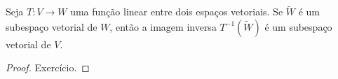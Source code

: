 \begin{theorem}
	Seja $T\colon V\to W$ uma função linear entre dois espaços vetoriais. Se $\widetilde{W}$ é um subespaço vetorial de $W$, então a imagem inversa $T^{-1}(\widetilde{W})$ é um subespaço vetorial de $V$.
\end{theorem}

\begin{proof}
	Exercício.
\end{proof}